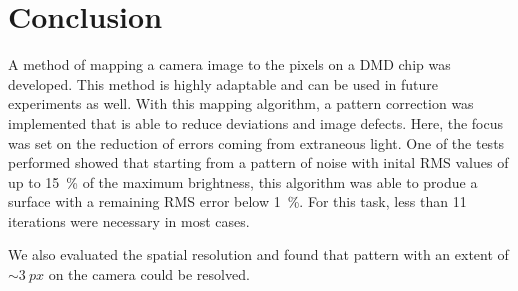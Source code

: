 

\chapter{Conclusion}
\label{cha:dmd_conclusion}
A method of mapping a camera image to the pixels on a DMD chip was developed. This method is highly adaptable and can be used in future experiments as well. With this mapping algorithm, a pattern correction was implemented that is able to reduce deviations and image defects. Here, the focus was set on the reduction of errors coming from extraneous light. One of the tests performed showed that starting from a pattern of noise with inital RMS values of up to \SI{15}{\percent} of the maximum brightness, this algorithm was able to produe a surface with a remaining RMS error below \SI{1}{\percent}. For this task, less than 11 iterations were necessary in most cases.

We also evaluated the spatial resolution and found that pattern with an extent of $\sim\!\SI{3}{px}$ on the camera could be resolved.

